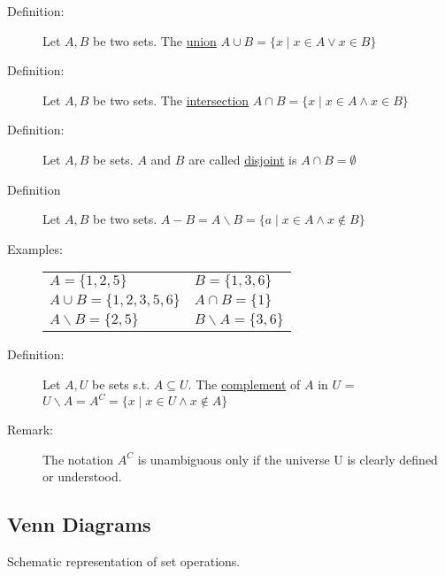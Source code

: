 \documentclass[10pt]{article}
\begin{document}
	\begin{description}
		\item[Definition:] Let $A, B$ be two sets. The \underline{union} $A \cup B = \{x \mid x \in A \lor x \in B \}$
		\item[Definition:] Let $A, B$ be two sets. The \underline{intersection} $A \cap B = \{x \mid x \in A \land x \in B \}$
		\item[Definition:] Let $A, B$ be sets. $A$ and $B$ are called \underline{disjoint} is $A \cap B = \emptyset$
		\item[Definition] Let $A, B$ be two sets. $A-B = A \backslash B = \{a \mid x \in A \land x \notin B \}$
		\item[Examples:]
		\begin{tabular}{ll}
			$A = \{1, 2, 5\}$ & $B = \{1, 3, 6\}$ \\
			$A \cup B = \{1, 2, 3, 5, 6\}$ & $A \cap B = \{1\}$ \\
			$A \backslash B = \{2, 5\}$ & $B \backslash A = \{3, 6\}$ \\
		\end{tabular}
		\item[Definition:] Let $A, U$ be sets s.t. $A \subseteq U$. The \underline{complement} of $A$ in $U$ = $U \backslash A = A^C = \{x \mid x \in U \land x \notin A \}$
		\item[Remark:] The notation $A^C$ is unambiguous only if the universe U is clearly defined or understood.
	\end{description}
	
	\subsection{Venn Diagrams}
	Schematic representation of set operations. \\
\end{document}
